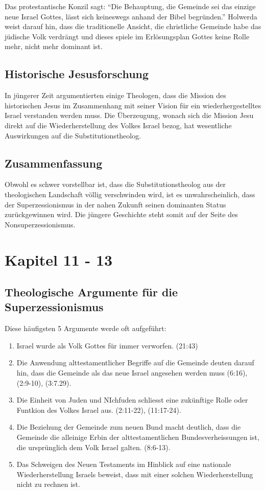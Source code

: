 \documentclass{../../inc/mybib}
\newcommand{\st}{Substitutionstheolog}
\newcommand{\sz}{Superzessionismus}
\begin{document}
    Das protestantische Konzil sagt: \enquote{Die Behauptung, die Gemeinde sei das einzige neue Israel Gottes, lässt sich keineswegs anhand der Bibel begründen.} 
    Holwerda weist darauf hin, dass die traditionelle Ansicht, die christliche Gemeinde habe das jüdische Volk verdrängt und dieses spiele im Erlösungsplan Gottes keine Rolle mehr, nicht mehr dominant ist.

    \subsection{Historische Jesusforschung}
    In jüngerer Zeit argumentierten einige Theologen, dass die Mission des historischen Jesus im Zusammenhang mit seiner Vision für ein wiederhergestelltes Israel verstanden werden muss. Die Überzeugung, wonach sich die Mission Jesu direkt auf die Wiederherstellung des Volkes Israel bezog, hat wesentliche Auswirkungen auf die \st.

    \subsection{Zusammenfassung}
    Obwohl es schwer vorstellbar ist, dass die \st{} aus der theologischen Landschaft völlig verschwinden wird, ist es unwahrscheinlich, dass der \sz{} in der nahen Zukunft seinen dominanten Status zurückgewinnen wird. Die jüngere Geschichte steht somit auf der Seite des Nonsuperzessionismus.

    \section{Kapitel 11 - 13}
    \subsection{Theologische Argumente für die \sz}
    Diese häufigsten 5 Argumente werde oft aufgeführt:
    \begin{enumerate}
        \item Israel wurde als Volk Gottes für immer verworfen. (21:43)
        \item Die Anwendung alttestamentlicher Begriffe auf die Gemeinde deuten darauf hin, dass die Gemeinde als das neue Israel angesehen werden muss (6:16), (2:9-10), (3:7.29).
        \item Die Einheit von Juden und NIchfuden schliesst eine zukünftige Rolle oder Funtkion des Volkes Israel aus. (2:11-22), (11:17-24).
        \item Die Beziehung der Gemeinde zum neuen Bund macht deutlich, dass die Gemeinde die alleinige Erbin der alttestamentlichen Bundesverheissungen ist, die ursprünglich dem Volk Israel galten. (8:6-13).
        \item Das Schweigen des Neuen Testaments im Hinblick auf eine nationale Wiederherstellung Israels beweist, dass mit einer solchen Wiederherstellung nicht zu rechnen ist.
    \end{enumerate}
    \newpage
   
\end{document}
